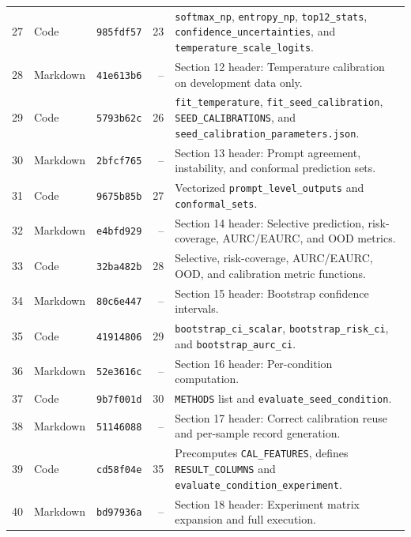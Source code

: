 \documentclass[11pt,a4paper]{article}
\begin{document}
\begin{small}
\begin{longtable}{r l l r L{0.50\textwidth}}
27 & Code & \texttt{985fdf57} & 23 & \texttt{softmax\_\allowbreak{}np}, \texttt{entropy\_\allowbreak{}np}, \texttt{top12\_\allowbreak{}stats}, \texttt{confidence\_\allowbreak{}uncertainties}, and \texttt{temperature\_\allowbreak{}scale\_\allowbreak{}logits}. \\
28 & Markdown & \texttt{41e613b6} & -- & Section 12 header: Temperature calibration on development data only. \\
29 & Code & \texttt{5793b62c} & 26 & \texttt{fit\_\allowbreak{}temperature}, \texttt{fit\_\allowbreak{}seed\_\allowbreak{}calibration}, \texttt{SEED\_\allowbreak{}CALIBRATIONS}, and \texttt{seed\_\allowbreak{}calibration\_\allowbreak{}parameters.\allowbreak{}json}. \\
30 & Markdown & \texttt{2bfcf765} & -- & Section 13 header: Prompt agreement, instability, and conformal prediction sets. \\
31 & Code & \texttt{9675b85b} & 27 & Vectorized \texttt{prompt\_\allowbreak{}level\_\allowbreak{}outputs} and \texttt{conformal\_\allowbreak{}sets}. \\
32 & Markdown & \texttt{e4bfd929} & -- & Section 14 header: Selective prediction, risk-coverage, AURC/EAURC, and OOD metrics. \\
33 & Code & \texttt{32ba482b} & 28 & Selective, risk-coverage, AURC/EAURC, OOD, and calibration metric functions. \\
34 & Markdown & \texttt{80c6e447} & -- & Section 15 header: Bootstrap confidence intervals. \\
35 & Code & \texttt{41914806} & 29 & \texttt{bootstrap\_\allowbreak{}ci\_\allowbreak{}scalar}, \texttt{bootstrap\_\allowbreak{}risk\_\allowbreak{}ci}, and \texttt{bootstrap\_\allowbreak{}aurc\_\allowbreak{}ci}. \\
36 & Markdown & \texttt{52e3616c} & -- & Section 16 header: Per-condition computation. \\
37 & Code & \texttt{9b7f001d} & 30 & \texttt{METHODS} list and \texttt{evaluate\_\allowbreak{}seed\_\allowbreak{}condition}. \\
38 & Markdown & \texttt{51146088} & -- & Section 17 header: Correct calibration reuse and per-sample record generation. \\
39 & Code & \texttt{cd58f04e} & 35 & Precomputes \texttt{CAL\_\allowbreak{}FEATURES}, defines \texttt{RESULT\_\allowbreak{}COLUMNS} and \texttt{evaluate\_\allowbreak{}condition\_\allowbreak{}experiment}. \\
40 & Markdown & \texttt{bd97936a} & -- & Section 18 header: Experiment matrix expansion and full execution. \\

\end{longtable}
\end{small}
\end{document}

